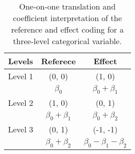 \begin{table}
\label{tab:code_scheme}
\centering
\begin{tabular}{ccc}
\hline
Levels & Referece & Effect\\
\hline
Level 1 & (0, 0) &  (1, 0)\\
        & $\beta_0$ & $\beta_0 + \beta_1$\\
Level 2 & (1, 0) &  (0, 1)\\
        & $\beta_0 + \beta_1$ & $\beta_0 + \beta_2$\\
Level 3 & (0, 1) &  (-1, -1)\\
        & $\beta_0 + \beta_2$ & $\beta_0 - \beta_1 - \beta_2$ \\
\hline
\end{tabular}
\caption{One-on-one translation and coefficient interpretation of the reference and effect coding for a three-level categorical variable.}
\end{table}
